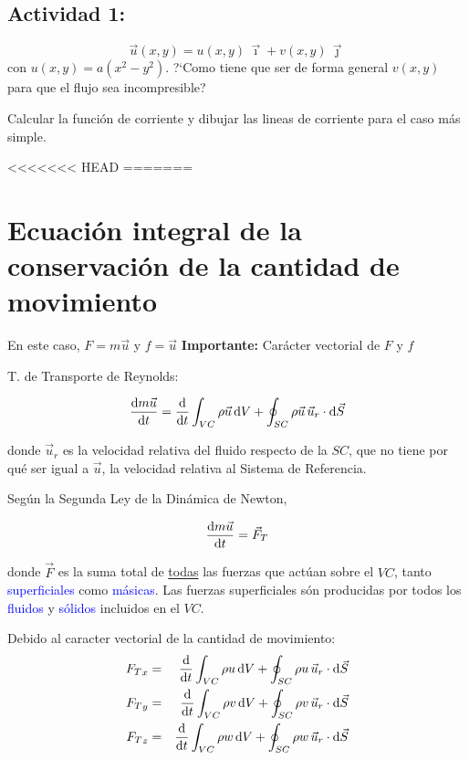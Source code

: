 	
\subsection*{Actividad 1:}
		\[
		\vec{u}(x,y)=u(x,y)\,\vec{\imath}+v(x,y)\,\vec{\jmath}
		\]
		con $u(x,y)=a(x^{2}-y^{2})$. ?`Como tiene que ser de forma general
		$v(x,y)$ para que el flujo sea incompresible?
		
		Calcular la función de corriente y dibujar las lineas de corriente
		para el caso más simple.

<<<<<<< HEAD
=======
\section{Ecuación integral de la conservación de la cantidad de movimiento}

	
	En este caso, $F=m\vec{u}$ y $f=\vec{u}$
	\textbf{Importante:}
		Carácter vectorial de $F$ y $f$
	
	T. de Transporte de Reynolds: 
	
	\begin{equation}
		\frac{\textrm{d} m\vec{u}}{\textrm{d} t}=\frac{\textrm{d} \phantom{}}{\textrm{d} t}\int_{VC}\rho\vec{u}\,\text{d}V+\oint_{SC}\rho\vec{u}\,\vec{u}_{r}\cdot\text{d}\vec{S}
	\end{equation}
	
	donde $\vec{u}_{r}$ es la velocidad relativa del fluido respecto
	de la $SC$, que no tiene por qué ser igual a $\vec{u}$, la velocidad
	relativa al Sistema de Referencia.

	
	Según la Segunda Ley de la Dinámica de Newton, 
	
\begin{equation}
		\frac{\textrm{d} m\vec{u}}{\textrm{d} t}=\vec{F}_{T}
\end{equation}
	
	donde $\vec{F}$ es la suma total de \underline{todas} las fuerzas
	que actúan sobre el $VC$, tanto \textcolor{blue}{superficiales} como
	\textcolor{blue}{másicas}. Las fuerzas superficiales són producidas
	por todos los \textcolor{blue}{fluidos} y \textcolor{blue}{sólidos}
	incluidos en el $VC$.
	
	Debido al caracter vectorial de la cantidad de movimiento: 
	\begin{eqnarray}
		{F_{T}}_{x} & = & \frac{\textrm{d} \phantom{}}{\textrm{d} t}\int_{VC}\rho u\,\text{d}V+\oint_{SC}\rho u\,\vec{u}_{r}\cdot\text{d}\vec{S}\\
		{F_{T}}_{y} & = & \frac{\textrm{d} \phantom{}}{\textrm{d} t}\int_{VC}\rho v\,\text{d}V+\oint_{SC}\rho v\,\vec{u}_{r}\cdot\text{d}\vec{S}\\
		{F_{T}}_{z} & = & \frac{\textrm{d} \phantom{}}{\textrm{d} t}\int_{VC}\rho w\,\text{d}V+\oint_{SC}\rho w\,\vec{u}_{r}\cdot\text{d}\vec{S}
	\end{eqnarray}
	


